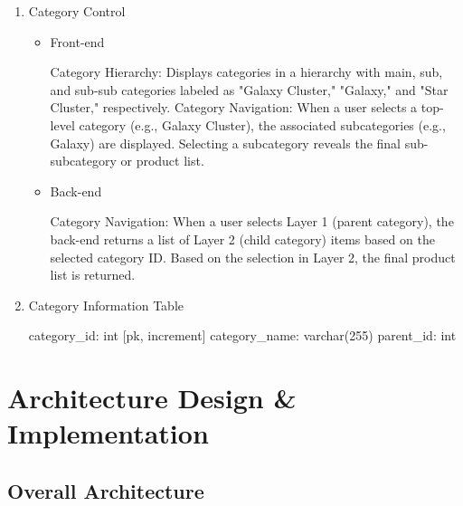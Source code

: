 \documentclass[conference]{IEEEtran}
\begin{document}
\begin{enumerate}
\setlength{\parindent}{2ex}
\item Category Control
\begin{itemize}
\setlength{\parindent}{2ex}
\item Front-end

Category Hierarchy: Displays categories in a hierarchy with main, sub, and sub-sub categories labeled as "Galaxy Cluster," "Galaxy," and "Star Cluster," respectively. \newline\hspace*{1.2ex}
Category Navigation: When a user selects a top-level category (e.g., Galaxy Cluster), the associated subcategories (e.g., Galaxy) are displayed. Selecting a subcategory reveals the final sub-subcategory or product list.

\item Back-end

Category Navigation: When a user selects Layer 1 (parent category), the back-end returns a list of Layer 2 (child category) items based on the selected category ID. Based on the selection in Layer 2, the final product list is returned.

\end{itemize}
\vspace{0.5cm}
\item Category Information Table

category\_id: int [pk, increment] \newline\hspace*{1.2ex}
category\_name: varchar(255) \newline\hspace*{1.2ex}        
parent\_id: int \newline\hspace*{1.2ex}

\hspace{0.5em}{\scriptsize Table attribute can be changed in development.}

\end{enumerate}

\section{Architecture Design \& Implementation}
\vspace{0.5cm}
\subsection{Overall Architecture}
\end{document}
